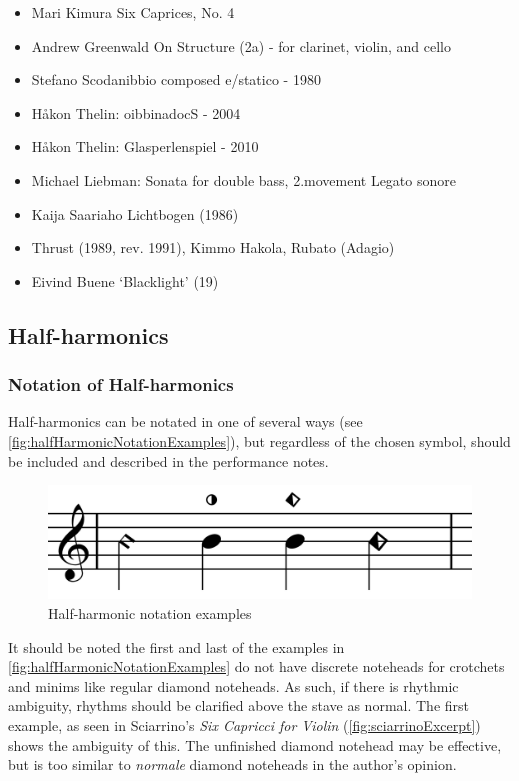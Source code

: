 \begin{itemize}
    \item Mari Kimura Six Caprices, No. 4 
    \item Andrew Greenwald On Structure (2a) - for clarinet, violin, and cello
    \item Stefano Scodanibbio composed e/statico - 1980
    \item Håkon Thelin: oibbinadocS - 2004
    \item Håkon Thelin: Glasperlenspiel - 2010
    \item Michael Liebman: Sonata for double bass, 2.movement Legato sonore
    \item Kaija Saariaho Lichtbogen (1986)
    \item Thrust (1989, rev. 1991),  Kimmo Hakola, Rubato (Adagio) 
    \item Eivind Buene `Blacklight' (19)
\end{itemize}

\subsection{Half-harmonics} \label{sec:half-harmonics}

\subsubsection{Notation of Half-harmonics} \label{sec:notation-half-harmonics}
Half-harmonics can be notated in one of several ways (see \autoref{fig:halfHarmonicNotationExamples}), but regardless of the chosen symbol, should be included and described in the performance notes.


\begin{figure}
    \includegraphics[width=\linewidth]{./resources/halfHarmonicNotationExamples.pdf}
    \caption{Half-harmonic notation examples} \label{fig:halfHarmonicNotationExamples}
  \end{figure}

It should be noted the first and last of the examples in \autoref{fig:halfHarmonicNotationExamples} do not have discrete noteheads for crotchets and minims like regular diamond noteheads.
As such, if there is rhythmic ambiguity, rhythms should be clarified above the stave as normal.
The first example, as seen in Sciarrino's \emph{Six Capricci for Violin} (\autoref{fig:sciarrinoExcerpt}) shows the ambiguity of this.
The unfinished diamond notehead may be effective, but is too similar to \emph{normale} diamond noteheads in the author's opinion.

